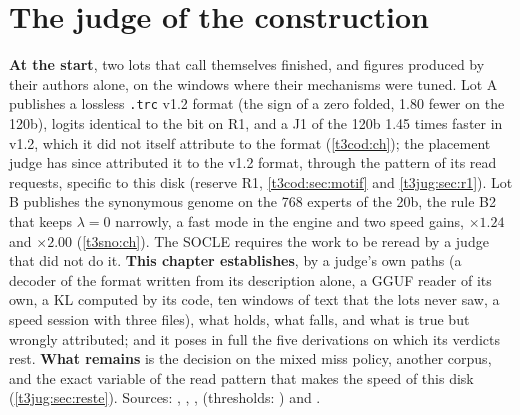 
\chapter{The judge of the construction}\label{t3jug:ch}

\begin{origine}
\textbf{At the start}, two lots that call themselves finished, and figures produced by their authors alone, on the windows where their mechanisms were tuned. Lot A publishes a lossless \texttt{.trc} v1.2 format (the sign of a zero folded, \SI{1.80}{\Go} fewer on the 120b), logits identical to the bit on R1, and a J1 of the 120b 1.45 times faster in v1.2, which it did not itself attribute to the format (\cref{t3cod:ch}); the placement judge has since attributed it to the v1.2 format, through the pattern of its read requests, specific to this disk (reserve R1, \cref{t3cod:sec:motif} and \cref{t3jug:sec:r1}). Lot B publishes the synonymous genome on the 768 experts of the 20b, the rule B2 that keeps $\lambda = 0$ narrowly, a fast mode in the engine and two speed gains, $\times 1.24$ and $\times 2.00$ (\cref{t3sno:ch}). The SOCLE requires the work to be reread by a judge that did not do it.
\textbf{This chapter establishes}, by a judge's own paths (a decoder of the format written from its description alone, a GGUF reader of its own, a KL computed by its code, ten windows of text that the lots never saw, a speed session with three files), what holds, what falls, and what is true but wrongly attributed; and it poses in full the five derivations on which its verdicts rest.
\textbf{What remains} is the decision on the mixed miss policy, another corpus, and the exact variable of the read pattern that makes the speed of this disk (\cref{t3jug:sec:reste}).
Sources: , , ,  (thresholds: ) and .
\end{origine}

